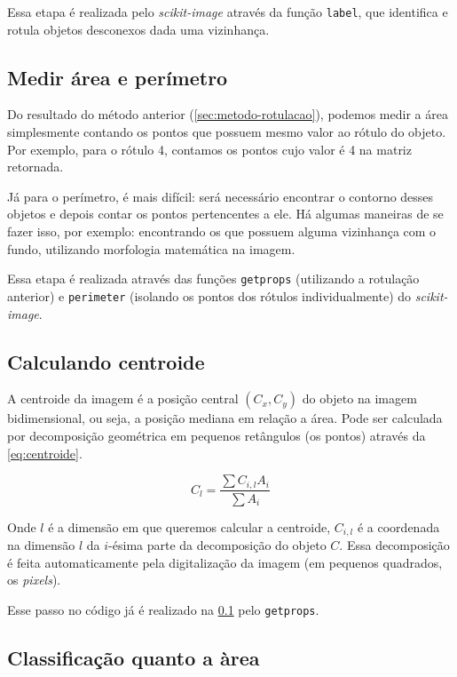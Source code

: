 \documentclass[brazilian,a4paper,twocolumn]{article}
\begin{document}
        Essa etapa é realizada pelo \emph{scikit-image} através da função \texttt{label}, que identifica e rotula objetos desconexos dada uma vizinhança.

    \subsection{Medir área e perímetro}
    \label{sec:metodo-area-perimetro}

        Do resultado do método anterior (\ref{sec:metodo-rotulacao}), podemos medir a área simplesmente contando os pontos que possuem mesmo valor ao rótulo do objeto. Por exemplo, para o rótulo 4, contamos os pontos cujo valor é 4 na matriz retornada.

        Já para o perímetro, é mais difícil: será necessário encontrar o contorno desses objetos e depois contar os pontos pertencentes a ele. Há algumas maneiras de se fazer isso, por exemplo: encontrando os que possuem alguma vizinhança com o fundo, utilizando morfologia matemática na imagem.

        Essa etapa é realizada através das funções \texttt{getprops} (utilizando a rotulação anterior) e \texttt{perimeter} (isolando os pontos dos rótulos individualmente) do \emph{scikit-image}.

    \subsection{Calculando centroide}

        A centroide da imagem é a posição central $ (C_x, C_y) $ do objeto na imagem bidimensional, ou seja, a posição mediana em relação a área. Pode ser calculada por decomposição geométrica em pequenos retângulos (os pontos) através da \cref{eq:centroide}.

        \begin{equation}
            \label{eq:centroide}
            C_l = \frac{\sum C_{i,l} A_i}{\sum A_i}
        \end{equation}

        Onde $l$ é a dimensão em que queremos calcular a centroide, $C_{i,l}$ é a coordenada na dimensão $l$ da $i$-ésima parte da decomposição do objeto $C$. Essa decomposição é feita automaticamente pela digitalização da imagem (em pequenos quadrados, os \textit{pixels}).

        Esse passo no código já é realizado na \cref{sec:metodo-area-perimetro} pelo \texttt{getprops}.

    \subsection{Classificação quanto a àrea}
\end{document}
